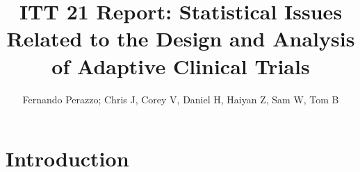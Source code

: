 \documentclass[12pt,a4paper]{article}
\title{ITT 21 Report: Statistical Issues Related to the Design and Analysis of Adaptive Clinical Trials} %
\author{Fernando Perazzo; Chris J, Corey V, Daniel H, Haiyan Z, Sam W, Tom B}
\begin{document}
\maketitle



\section{Introduction}


\end{document}

